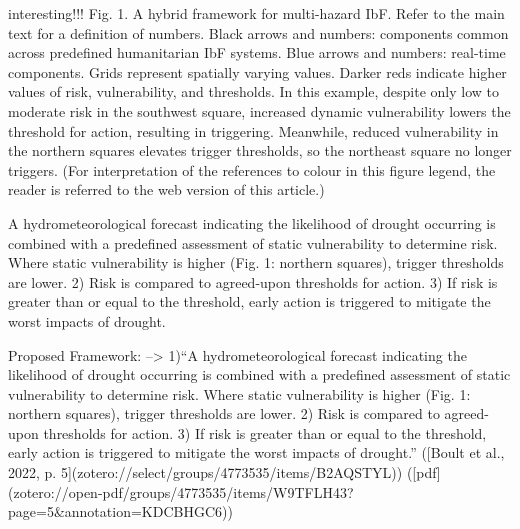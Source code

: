 {interesting!!! Fig. 1. A hybrid framework for multi-hazard IbF. Refer to the main text for a definition of numbers. Black arrows and numbers: components common across predefined humanitarian IbF systems. Blue arrows and numbers: real-time components. Grids represent spatially varying values. Darker reds indicate higher values of risk, vulnerability, and thresholds. In this example, despite only low to moderate risk in the southwest square, increased dynamic vulnerability lowers the threshold for action, resulting in triggering. Meanwhile, reduced vulnerability in the northern squares elevates trigger thresholds, so the northeast square no longer triggers. (For interpretation of the references to colour in this figure legend, the reader is referred to the web version of this article.)

A hydrometeorological forecast indicating the likelihood of drought occurring is combined with a predefined assessment of static vulnerability to determine risk. Where static vulnerability is higher (Fig. 1: northern squares), trigger thresholds are lower. 2) Risk is compared to agreed-upon thresholds for action. 3) If risk is greater than or equal to the threshold, early action is triggered to mitigate the worst impacts of drought.

Proposed Framework:
--> 1)“A hydrometeorological forecast indicating the likelihood of drought occurring is combined with a predefined assessment of static vulnerability to determine risk. Where static vulnerability is higher (Fig. 1: northern squares), trigger thresholds are lower.
2) Risk is compared to agreed-upon thresholds for action.
3) If risk is greater than or equal to the threshold, early action is triggered to mitigate the worst impacts of drought.” ([Boult et al., 2022, p. 5](zotero://select/groups/4773535/items/B2AQSTYL)) ([pdf](zotero://open-pdf/groups/4773535/items/W9TFLH43?page=5&annotation=KDCBHGC6))

}
